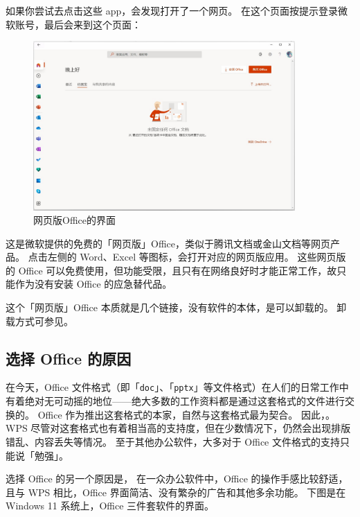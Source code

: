 如果你尝试去点击这些 app，会发现打开了一个网页。
在这个页面按提示登录微软账号，最后会来到这个页面：

\begin{figure}[htb!]
  \centering
  \includegraphics[width=10cm]{assets/Office_Web.jpg}
  \caption{网页版Office的界面}
  \label{Office_Web}
\end{figure}

这是微软提供的免费的「网页版」Office，类似于腾讯文档或金山文档等网页产品。
点击左侧的 Word、Excel 等图标，会打开对应的网页版应用。
这些网页版的 Office 可以免费使用，但功能受限，且只有在网络良好时才能正常工作，故只能作为没有安装 Office 的应急替代品。

这个「网页版」Office 本质就是几个链接，没有软件的本体，是可以卸载的。
卸载方式可参见。

\subsection{选择 Office 的原因}

在今天，Office 文件格式（即「\verb|doc|」、「\verb|pptx|」等文件格式）在人们的日常工作中有着绝对无可动摇的地位——绝大多数的工作资料都是通过这套格式的文件进行交换的。
Office 作为推出这套格式的本家，自然与这套格式最为契合。
因此，。
WPS 尽管对这套格式也有着相当高的支持度，但在少数情况下，仍然会出现排版错乱、内容丢失等情况。
至于其他办公软件，大多对于 Office 文件格式的支持只能说「勉强」。

选择 Office 的另一个原因是，
在一众办公软件中，Office 的操作手感比较舒适，且与 WPS 相比，Office 界面简洁、没有繁杂的广告和其他多余功能。
下图是在 Windows 11 系统上，Office 三件套软件的界面。

